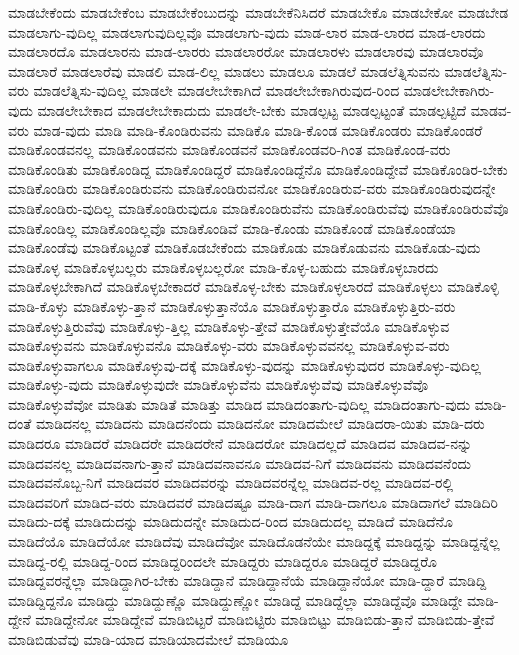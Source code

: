{ಮಾಡಬೇಕೆಂದು
ಮಾಡಬೇಕೆಂಬ
ಮಾಡಬೇಕೆಂಬುದನ್ನು
ಮಾಡಬೇಕೆನಿಸಿದರೆ
ಮಾಡಬೇಕೊ
ಮಾಡಬೇಕೋ
ಮಾಡಬೇಡ
ಮಾಡಲಾಗು-ವುದಿಲ್ಲ
ಮಾಡಲಾಗುವುದಿಲ್ಲವೊ
ಮಾಡಲಾಗು-ವುದು
ಮಾಡ-ಲಾರ
ಮಾಡ-ಲಾರದ
ಮಾಡ-ಲಾರದು
ಮಾಡಲಾರದೊ
ಮಾಡಲಾರನು
ಮಾಡ-ಲಾರರು
ಮಾಡಲಾರರೋ
ಮಾಡಲಾರಳು
ಮಾಡಲಾರವು
ಮಾಡಲಾರವೊ
ಮಾಡಲಾರೆ
ಮಾಡಲಾರೆವು
ಮಾಡಲಿ
ಮಾಡ-ಲಿಲ್ಲ
ಮಾಡಲು
ಮಾಡಲೂ
ಮಾಡಲೆ
ಮಾಡಲೆತ್ನಿಸುವನು
ಮಾಡಲೆತ್ನಿಸು-ವರು
ಮಾಡಲೆತ್ನಿಸು-ವುದಿಲ್ಲ
ಮಾಡಲೇ
ಮಾಡಲೇಬೇಕಾಗಿದೆ
ಮಾಡಲೇಬೇಕಾಗಿರುವುದ-ರಿಂದ
ಮಾಡಲೇಬೇಕಾಗಿರು-ವುದು
ಮಾಡಲೇಬೇಕಾದ
ಮಾಡಲೇಬೇಕಾದುದು
ಮಾಡಲೇ-ಬೇಕು
ಮಾಡಲ್ಪಟ್ಟ
ಮಾಡಲ್ಪಟ್ಟಂತೆ
ಮಾಡಲ್ಪಟ್ಟಿದೆ
ಮಾಡವ-ವರು
ಮಾಡ-ವುದು
ಮಾಡಿ
ಮಾಡಿ-ಕೊಂಡಿರುವನು
ಮಾಡಿಕೊ
ಮಾಡಿ-ಕೊಂಡ
ಮಾಡಿಕೊಂಡರು
ಮಾಡಿಕೊಂಡರೆ
ಮಾಡಿಕೊಂಡವನಲ್ಲ
ಮಾಡಿಕೊಂಡವನು
ಮಾಡಿಕೊಂಡವನೆ
ಮಾಡಿಕೊಂಡವರಿ-ಗಿಂತ
ಮಾಡಿಕೊಂಡ-ವರು
ಮಾಡಿಕೊಂಡಿತು
ಮಾಡಿಕೊಂಡಿದ್ದ
ಮಾಡಿಕೊಂಡಿದ್ದರೆ
ಮಾಡಿಕೊಂಡಿದ್ದೆನೊ
ಮಾಡಿಕೊಂಡಿದ್ದೇವೆ
ಮಾಡಿಕೊಂಡಿರ-ಬೇಕು
ಮಾಡಿಕೊಂಡಿರು
ಮಾಡಿಕೊಂಡಿರುವನು
ಮಾಡಿಕೊಂಡಿರುವನೋ
ಮಾಡಿಕೊಂಡಿರುವ-ವರು
ಮಾಡಿಕೊಂಡಿರುವುದನ್ನೇ
ಮಾಡಿಕೊಂಡಿರು-ವುದಿಲ್ಲ
ಮಾಡಿಕೊಂಡಿರುವುದೂ
ಮಾಡಿಕೊಂಡಿರುವೆನು
ಮಾಡಿಕೊಂಡಿರುವೆವು
ಮಾಡಿಕೊಂಡಿರುವೆವೊ
ಮಾಡಿಕೊಂಡಿಲ್ಲ
ಮಾಡಿಕೊಂಡಿಲ್ಲವೊ
ಮಾಡಿಕೊಂಡಿವೆ
ಮಾಡಿ-ಕೊಂಡು
ಮಾಡಿಕೊಂಡೆ
ಮಾಡಿಕೊಂಡೆಯಾ
ಮಾಡಿಕೊಂಡೆವು
ಮಾಡಿಕೊಟ್ಟಂತೆ
ಮಾಡಿಕೊಡಬೇಕೆಂದು
ಮಾಡಿಕೊಡು
ಮಾಡಿಕೊಡುವನು
ಮಾಡಿಕೊಡು-ವುದು
ಮಾಡಿಕೊಳ್ಳ
ಮಾಡಿಕೊಳ್ಳಬಲ್ಲರು
ಮಾಡಿಕೊಳ್ಳಬಲ್ಲರೋ
ಮಾಡಿ-ಕೊಳ್ಳ-ಬಹುದು
ಮಾಡಿಕೊಳ್ಳಬಾರದು
ಮಾಡಿಕೊಳ್ಳಬೇಕಾಗಿದೆ
ಮಾಡಿಕೊಳ್ಳಬೇಕಾದರೆ
ಮಾಡಿಕೊಳ್ಳ-ಬೇಕು
ಮಾಡಿಕೊಳ್ಳಲಾರದೆ
ಮಾಡಿಕೊಳ್ಳಲು
ಮಾಡಿಕೊಳ್ಳಿ
ಮಾಡಿ-ಕೊಳ್ಳು
ಮಾಡಿಕೊಳ್ಳು-ತ್ತಾನೆ
ಮಾಡಿಕೊಳ್ಳುತ್ತಾನೆಯೊ
ಮಾಡಿಕೊಳ್ಳುತ್ತಾರೊ
ಮಾಡಿಕೊಳ್ಳುತ್ತಿರು-ವರು
ಮಾಡಿಕೊಳ್ಳುತ್ತಿರುವೆವು
ಮಾಡಿಕೊಳ್ಳು-ತ್ತಿಲ್ಲ
ಮಾಡಿಕೊಳ್ಳು-ತ್ತೇವೆ
ಮಾಡಿಕೊಳ್ಳುತ್ತೇವೆಯೊ
ಮಾಡಿಕೊಳ್ಳುವ
ಮಾಡಿಕೊಳ್ಳುವನು
ಮಾಡಿಕೊಳ್ಳುವನೊ
ಮಾಡಿಕೊಳ್ಳು-ವರು
ಮಾಡಿಕೊಳ್ಳುವವನಲ್ಲ
ಮಾಡಿಕೊಳ್ಳುವ-ವರು
ಮಾಡಿಕೊಳ್ಳುವಾಗಲೂ
ಮಾಡಿಕೊಳ್ಳುವು-ದಕ್ಕೆ
ಮಾಡಿಕೊಳ್ಳು-ವುದನ್ನು
ಮಾಡಿಕೊಳ್ಳುವುದರ
ಮಾಡಿಕೊಳ್ಳು-ವುದಿಲ್ಲ
ಮಾಡಿಕೊಳ್ಳು-ವುದು
ಮಾಡಿಕೊಳ್ಳುವುದೇ
ಮಾಡಿಕೊಳ್ಳುವೆನು
ಮಾಡಿಕೊಳ್ಳುವೆವು
ಮಾಡಿಕೊಳ್ಳುವೆವೊ
ಮಾಡಿಕೊಳ್ಳುವೆವೋ
ಮಾಡಿತು
ಮಾಡಿತೆ
ಮಾಡಿತ್ತು
ಮಾಡಿದ
ಮಾಡಿದಂತಾಗು-ವುದಿಲ್ಲ
ಮಾಡಿದಂತಾಗು-ವುದು
ಮಾಡಿ-ದಂತೆ
ಮಾಡಿದನಲ್ಲ
ಮಾಡಿದನು
ಮಾಡಿದನೆಂದು
ಮಾಡಿದನೋ
ಮಾಡಿದಮೇಲೆ
ಮಾಡಿದರಾ-ಯಿತು
ಮಾಡಿ-ದರು
ಮಾಡಿದರೂ
ಮಾಡಿದರೆ
ಮಾಡಿದರೇ
ಮಾಡಿದರೇನೆ
ಮಾಡಿದರೋ
ಮಾಡಿದಲ್ಲದೆ
ಮಾಡಿದವ
ಮಾಡಿದವ-ನನ್ನು
ಮಾಡಿದವನಲ್ಲ
ಮಾಡಿದವನಾಗು-ತ್ತಾನೆ
ಮಾಡಿದವನಾವನೂ
ಮಾಡಿದವ-ನಿಗೆ
ಮಾಡಿದವನು
ಮಾಡಿದವನೆಂದು
ಮಾಡಿದವನೊಬ್ಬ-ನಿಗೆ
ಮಾಡಿದವರ
ಮಾಡಿದವರನ್ನು
ಮಾಡಿದವರನ್ನೆಲ್ಲ
ಮಾಡಿದವ-ರಲ್ಲ
ಮಾಡಿದವ-ರಲ್ಲಿ
ಮಾಡಿದವರಿಗೆ
ಮಾಡಿದ-ವರು
ಮಾಡಿದವರೆ
ಮಾಡಿದಷ್ಟೂ
ಮಾಡಿ-ದಾಗ
ಮಾಡಿ-ದಾಗಲೂ
ಮಾಡಿದಾಗಲೆ
ಮಾಡಿದಿರಿ
ಮಾಡಿದು-ದಕ್ಕೆ
ಮಾಡಿದುದನ್ನು
ಮಾಡಿದುದನ್ನೇ
ಮಾಡಿದುದ-ರಿಂದ
ಮಾಡಿದುದಲ್ಲ
ಮಾಡಿದೆ
ಮಾಡಿದೆನೊ
ಮಾಡಿದೆಯೊ
ಮಾಡಿದೆಯೋ
ಮಾಡಿದೆವು
ಮಾಡಿದೆವೋ
ಮಾಡಿದೊಡನೆಯೇ
ಮಾಡಿದ್ದಕ್ಕೆ
ಮಾಡಿದ್ದನ್ನು
ಮಾಡಿದ್ದನ್ನೆಲ್ಲ
ಮಾಡಿದ್ದ-ರಲ್ಲಿ
ಮಾಡಿದ್ದ-ರಿಂದ
ಮಾಡಿದ್ದರಿಂದಲೇ
ಮಾಡಿದ್ದರು
ಮಾಡಿದ್ದರೂ
ಮಾಡಿದ್ದರೆ
ಮಾಡಿದ್ದರೊ
ಮಾಡಿದ್ದವರನ್ನೆಲ್ಲಾ
ಮಾಡಿದ್ದಾಗಿರ-ಬೇಕು
ಮಾಡಿದ್ದಾನೆ
ಮಾಡಿದ್ದಾನೆಯೆ
ಮಾಡಿದ್ದಾನೆಯೋ
ಮಾಡಿ-ದ್ದಾರೆ
ಮಾಡಿದ್ದಿ
ಮಾಡಿದ್ದಿದ್ದನೊ
ಮಾಡಿದ್ದು
ಮಾಡಿದ್ದುಣ್ಣೊ
ಮಾಡಿದ್ದುಣ್ಣೋ
ಮಾಡಿದ್ದೆ
ಮಾಡಿದ್ದೆಲ್ಲಾ
ಮಾಡಿದ್ದೆವೊ
ಮಾಡಿದ್ದೇ
ಮಾಡಿ-ದ್ದೇನೆ
ಮಾಡಿದ್ದೇನೋ
ಮಾಡಿದ್ದೇವೆ
ಮಾಡಿಬಿಟ್ಟರೆ
ಮಾಡಿಬಿಟ್ಟಿರು
ಮಾಡಿಬಿಟ್ಟು
ಮಾಡಿಬಿಡು-ತ್ತಾನೆ
ಮಾಡಿಬಿಡು-ತ್ತೇವೆ
ಮಾಡಿಬಿಡುವೆವು
ಮಾಡಿ-ಯಾದ
ಮಾಡಿಯಾದಮೇಲೆ
ಮಾಡಿಯೂ
}
